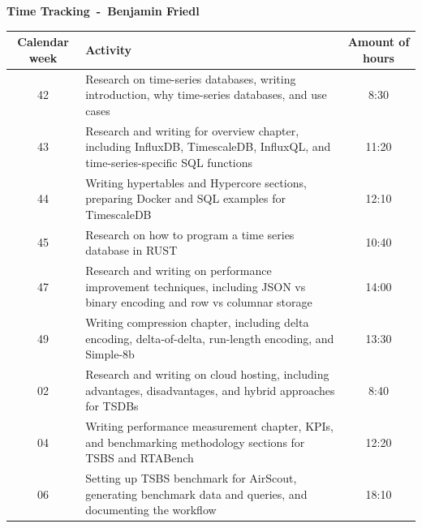 \textbf{\huge Time Tracking~-~Benjamin Friedl}

\begin{table}[H]
    \centering
    \begin{tabularx}{\textwidth}{|c|X|c|} %
        \hline %
        Calendar week & Activity                                                                                                                                        & Amount of hours \\
        \hline %
        42            & Research on time-series databases, writing introduction, why time-series databases, and use cases                                               & 8:30            \\
        \hline %
        43            & Research and writing for overview chapter, including InfluxDB, TimescaleDB, InfluxQL, and time-series-specific SQL functions                    & 11:20           \\
        \hline %
        44            & Writing hypertables and Hypercore sections, preparing Docker and SQL examples for TimescaleDB                                                   & 12:10           \\
        \hline %
        45            & Research on how to program a time series database in RUST                                                                                       & 10:40           \\
        \hline %
        47            & Research and writing on performance improvement techniques, including JSON vs binary encoding and row vs columnar storage                       & 14:00           \\
        \hline %
        49            & Writing compression chapter, including delta encoding, delta-of-delta, run-length encoding, and Simple-8b                                       & 13:30           \\
        \hline %
        02            & Research and writing on cloud hosting, including advantages, disadvantages, and hybrid approaches for TSDBs                                     & 8:40            \\
        \hline %
        04            & Writing performance measurement chapter, KPIs, and benchmarking methodology sections for TSBS and RTABench                                      & 12:20           \\
        \hline %
        06            & Setting up TSBS benchmark for AirScout, generating benchmark data and queries, and documenting the workflow                                     & 18:10           \\

\end{tabularx}
\end{table}

